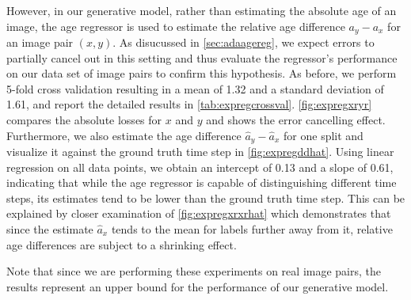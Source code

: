 However, in our generative model, rather than estimating the absolute age of an image, the age regressor is used to estimate the relative age difference $a_y - a_x$ for an image pair $(x, y)$. As disucussed in \autoref{sec:adaagereg}, we expect errors to partially cancel out in this setting and thus evaluate the regressor's performance on our data set of image pairs to confirm this hypothesis. As before, we perform 5-fold cross validation resulting in a mean of 1.32 and a standard deviation of 1.61, and report the detailed results in \autoref{tab:expregcrossval}. \autoref{fig:expregxryr} compares the absolute losses for $x$ and $y$ and shows the error cancelling effect. Furthermore, we also estimate the age difference $\hat a_y - \hat a_x$ for one split and visualize it against the ground truth time step in \autoref{fig:expregddhat}. Using linear regression on all data points, we obtain an intercept of 0.13 and a slope of 0.61, indicating that while the age regressor is capable of distinguishing different time steps, its estimates tend to be lower than the ground truth time step. This can be explained by closer examination of \autoref{fig:expregxrxrhat} which demonstrates that since the estimate $\hat a_x$ tends to the mean for labels further away from it, relative age differences are subject to a shrinking effect. 

Note that since we are performing these experiments on real image pairs, the results represent an upper bound for the performance of our generative model.

